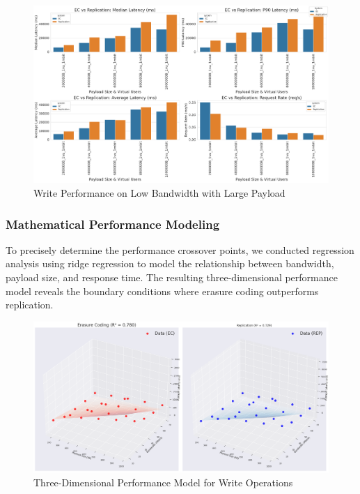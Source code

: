 \begin{figure}[ht]
    \centering
    \includegraphics[width=\columnwidth]{resources/chapter-4/write_bigload_slownet.png}
    \caption{Write Performance on Low Bandwidth with Large Payload}
    \label{fig:write-performance-comparison}
\end{figure}

\subsubsection{Mathematical Performance Modeling}

To precisely determine the performance crossover points, we conducted regression analysis using ridge regression to model the relationship between bandwidth, payload size, and response time. The resulting three-dimensional performance model reveals the boundary conditions where erasure coding outperforms replication.

\begin{figure}[ht]
    \centering
    \includegraphics[width=\columnwidth]{resources/chapter-4/write_bigload_avgnet_regression.png}
    \caption{Three-Dimensional Performance Model for Write Operations}
    \label{fig:write-regression-model}
\end{figure}

